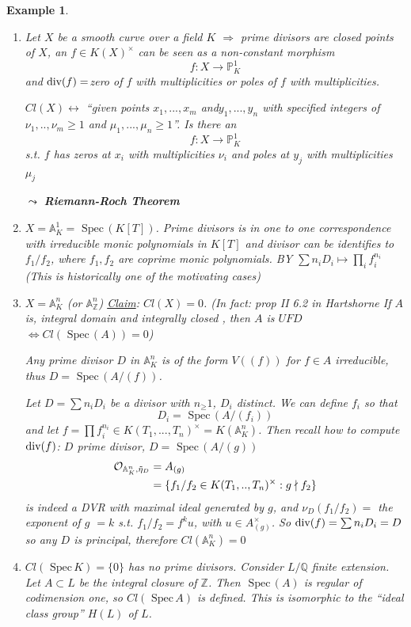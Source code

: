 \documentclass[11pt]{article}
\newtheorem{ex}[thm]{Example}
\newcommand{\spec}{\text{ Spec}\,}
\newcommand{\affn}{\mathbb A}
\newcommand{\proj}{\mathbb P}
\newcommand{\intg}{\mathbb Z}
\newcommand{\ratl}{\mathbb Q}
\newcommand{\calo}{{\cal O}}
\renewcommand{\div}{\textnormal{div}}
\newcommand{\Lrta}{\Longrightarrow}
\newcommand{\lrta}{\longrightarrow}
\newcommand{\llrta}{\longleftrightarrow}
\newcommand{\Llrta}{\Longleftrightarrow}
\begin{document}
\begin{ex}
\begin{enumerate}[label=(\arabic*)]
\item
Let $X$ be  a smooth curve over a field $K$
$\Lrta$ prime divisors are closed points of $X$, an $f\in K(X)^\times$ can be seen as a non-constant morphism 
$$
f:X\lrta \proj^1_K
$$
and $\div(f)=$zero of $f$ with multiplicities or poles of $f$ with multiplicities.

$Cl(X)\llrta$ ``given points $x_1,...,x_m$ and$y_1,...,y_n$  with specified integers of $\nu_1,..,\nu_m\geq 1$ and $\mu_1,...,\mu_n\geq 1$''. Is there an 
$$
f: X\lrta \proj^1_K
$$
s.t. $f$ has zeros at $x_i$ with multiplicities $\nu_i$ and poles at $y_j$ with multiplicities $\mu_j$

$\leadsto$ \textbf{Riemann-Roch Theorem}
\item $X=\affn^1_K=\spec(K[T])$. Prime divisors is in one to one correspondence with irreducible monic polynomials in $K[T]$ and divisor can be identifies to $f_1/f_2$, where $f_1,f_2$ are coprime monic polynomials. BY $\sum n_i D_i\mapsto \prod_i f_i^{n_i}$ 
(This is historically one of the motivating cases)
\item $X=\affn^n_K$ (or $\affn^n_\intg$)
\underline{Claim}: $Cl(X)=0$.
(In fact: prop II 6.2 in Hartshorne If $A$ is, integral domain and integrally closed , then $A$ is $UFD$ $\Llrta Cl(\spec(A))=0$)

Any prime divisor $D$ in $\affn^n_K$ is of the form $V((f))$ for $f\in A$ irreducible, thus $D=\spec(A/(f))$.

 Let $D=\sum n_i D_i$ be a divisor with $n_\geq 1$, $D_i$ distinct. We can define $f_i$ so that
 $$
D_i=\spec(A/(f_i))
 $$
 and let $f=\prod f_i^{n_i}\in K(T_1,...,T_n)^\times=K(\affn^n_K)$.
 Then recall how to compute $\div(f)$: $D$ prime divisor, $D=\spec(A/(g))$
 $$
 \begin{aligned}
 \calo_{\affn^n_K,\tilde{\eta}_D}
 &=A_{(g)}\\
 &=\{f_1/f_2\in K(T_1,..,T_n)^\times: g\nmid f_2\}
 \end{aligned}
 $$
 is indeed a DVR with maximal ideal generated by $g$, and $\nu_D(f_1/f_2)=$ the exponent of $g$ $=k$ s.t. 
 $f_1/f_2=f^k u$, with $u\in A_{(g)}^\times$. So $\div(f)=\sum n_i D_i=D$ so any $D$ is principal, therefore $Cl(\affn^n_K)=0$

\item $Cl(\spec K)=\{0\}$ has no prime divisors. Consider $L/\ratl$ finite extension. Let $A\subset L$ be the integral closure of $\intg$. Then $\spec(A)$ is regular of codimension one, so 
$
Cl(\spec A)
$
is defined.
This is isomorphic to the ``ideal class group'' $H(L)$ of $L$.


\end{enumerate}
\end{ex}
\end{document}
